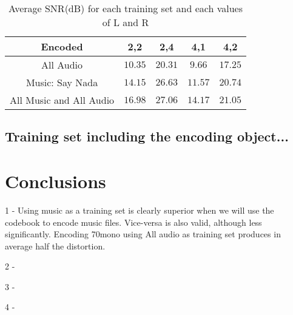 \documentclass[a4paper, 11pt]{article}
\begin{document}
		\begin{table}[H]
			\centering
			\begin{tabular}{c|c|c|c|c}
				\textbf{Encoded} 			& \textbf{2,2} 	& \textbf{2,4}	& \textbf{4,1}	& \textbf{4,2} \\ \hline
				All Audio 					& $ 10.35 $ 	& $ 20.31 $		& $ 9.66 $ 		& $ 17.25 $	\\ \hline
				Music: Say Nada				& $ 14.15 $		& $ 26.63 $		& $ 11.57 $ 	& $ 20.74 $	\\ \hline
				All Music and All Audio 	& $ 16.98 $		& $	27.06 $		& $ 14.17 $		& $	21.05 $	\\
			\end{tabular}
			\caption{Average SNR(dB) for each training set and each values of L and R}
			\label{table:EncodeSNRT}
		\end{table}
		
		
		\subsection{Training set including the encoding object...}
			
	
	\section{Conclusions}
	
		1 - Using music as a training set is clearly superior when we will use the codebook to encode music files.
			Vice-versa is also valid, although less significantly. Encoding 70mono using All audio as training set produces in average half the distortion.
		
		2 - 
		
		3 - 
		
		4 - 
		
		
		
		
		
		
\end{document}

